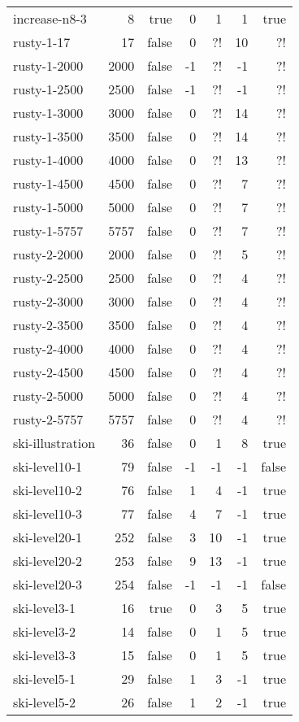 \begin{longtable}{lrrrrrr}
	increase-n8-3 & 8 & true & 0 & 1 & 1 & true\\
	rusty-1-17 & 17 & false & 0 & ?! & 10 & ?!\\
	rusty-1-2000 & 2000 & false & -1 & ?! & -1 & ?!\\
	rusty-1-2500 & 2500 & false & -1 & ?! & -1 & ?!\\
	rusty-1-3000 & 3000 & false & 0 & ?! & 14 & ?!\\
	rusty-1-3500 & 3500 & false & 0 & ?! & 14 & ?!\\
	rusty-1-4000 & 4000 & false & 0 & ?! & 13 & ?!\\
	rusty-1-4500 & 4500 & false & 0 & ?! & 7 & ?!\\
	rusty-1-5000 & 5000 & false & 0 & ?! & 7 & ?!\\
	rusty-1-5757 & 5757 & false & 0 & ?! & 7 & ?!\\
	rusty-2-2000 & 2000 & false & 0 & ?! & 5 & ?!\\
	rusty-2-2500 & 2500 & false & 0 & ?! & 4 & ?!\\
	rusty-2-3000 & 3000 & false & 0 & ?! & 4 & ?!\\
	rusty-2-3500 & 3500 & false & 0 & ?! & 4 & ?!\\
	rusty-2-4000 & 4000 & false & 0 & ?! & 4 & ?!\\
	rusty-2-4500 & 4500 & false & 0 & ?! & 4 & ?!\\
	rusty-2-5000 & 5000 & false & 0 & ?! & 4 & ?!\\
	rusty-2-5757 & 5757 & false & 0 & ?! & 4 & ?!\\
	ski-illustration & 36 & false & 0 & 1 & 8 & true\\
	ski-level10-1 & 79 & false & -1 & -1 & -1 & false\\
	ski-level10-2 & 76 & false & 1 & 4 & -1 & true\\
	ski-level10-3 & 77 & false & 4 & 7 & -1 & true\\
	ski-level20-1 & 252 & false & 3 & 10 & -1 & true\\
	ski-level20-2 & 253 & false & 9 & 13 & -1 & true\\
	ski-level20-3 & 254 & false & -1 & -1 & -1 & false\\
	ski-level3-1 & 16 & true & 0 & 3 & 5 & true\\
	ski-level3-2 & 14 & false & 0 & 1 & 5 & true\\
	ski-level3-3 & 15 & false & 0 & 1 & 5 & true\\
	ski-level5-1 & 29 & false & 1 & 3 & -1 & true\\
	ski-level5-2 & 26 & false & 1 & 2 & -1 & true\\

\end{longtable}
